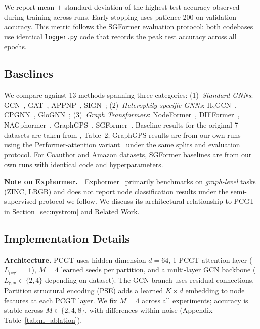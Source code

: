 We report mean $\pm$ standard deviation of the highest test accuracy observed during training across runs. Early stopping uses patience 200 on validation accuracy. This metric follows the SGFormer evaluation protocol: both codebases use identical \texttt{logger.py} code that records the peak test accuracy across all epochs.

\subsection{Baselines}

We compare against 13 methods spanning three categories: (1)~\emph{Standard GNNs}: GCN~\citep{kipf2017semi}, GAT~\citep{velickovic2018gat}, APPNP~\citep{klicpera2019appnp}, SIGN~\citep{rossi2020sign}; (2)~\emph{Heterophily-specific GNNs}: H$_2$GCN~\citep{zhu2020h2gcn}, CPGNN~\citep{zhu2021cpgnn}, GloGNN~\citep{li2022glognn}; (3)~\emph{Graph Transformers}: NodeFormer~\citep{wu2022nodeformer}, DIFFormer~\citep{wu2023difformer}, NAGphormer~\citep{chen2023nagphormer}, GraphGPS~\citep{rampasek2022graphgps}, SGFormer~\citep{wu2023sgformer}. Baseline results for the original 7 datasets are taken from \citet{wu2023sgformer}, Table~2; GraphGPS results are from our own runs using the Performer-attention variant~\citep{rampasek2022graphgps} under the same splits and evaluation protocol. For Coauthor and Amazon datasets, SGFormer baselines are from our own runs with identical code and hyperparameters.

\noindent\textbf{Note on Exphormer.}~~Exphormer~\citep{shirzad2023exphormer} primarily benchmarks on \emph{graph-level} tasks (ZINC, LRGB) and does not report node classification results under the semi-supervised protocol we follow. We discuss its architectural relationship to PCGT in Section~\ref{sec:nystrom} and Related Work.

\subsection{Implementation Details}

\textbf{Architecture.} PCGT uses hidden dimension $d=64$, 1 PCGT attention layer ($L_\text{pcgt}=1$), $M=4$ learned seeds per partition, and a multi-layer GCN backbone ($L_\text{gcn} \in \{2, 4\}$ depending on dataset). The GCN branch uses residual connections. Partition structural encoding (PSE) adds a learned $K \times d$ embedding to node features at each PCGT layer. We fix $M=4$ across all experiments; accuracy is stable across $M \in \{2, 4, 8\}$, with differences within noise (Appendix Table~\ref{tab:m_ablation}).

